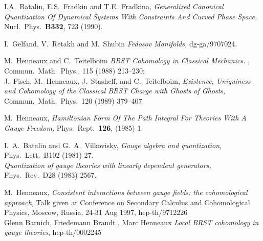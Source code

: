 \documentclass[a4paper,11pt,oneside]{amsart}
\theoremstyle{plain}
\numberwithin{equation}{section} %
\numberwithin{figure}{section} %
\def\PRD{Phys.\ Rev.\ D}
\def\PLB{Phys.\ Lett.\ B}
\begin{document}
\begin{thebibliography}{33}
\bibitem{[BFF]}
I.A.~Batalin, E.S.~Fradkin and T.E.~Fradkina,
{\em Generalized Canonical Quantization Of Dynamical Systems With
  Constraints And Curved Phase Space,}
Nucl.\ Phys.\ {\bf B332}, 723 (1990).

\bibitem{[GRS]} I.~Gelfand, V.~Retakh and M.~Shubin
{\em Fedosov Manifolds,} dg-ga/9707024.

\bibitem{[HTS]} M.~Henneaux and C.~Teitelboim
{\em BRST Cohomology in Classical Mechanics.}
, Commun.\ Math.\ Phys., 115
(1988) 213--230;\\
 J.~Fisch, M.~Henneaux, J.~Stasheff, and C.~Teitelboim,
{\em Existence, Uniquiness and Cohomology of the Classical BRST Charge with
Ghosts of Ghosts,} Commun.\ Math.\ Phys.\ 120 (1989) 379--407.

\bibitem{[H-omega]} M.~Henneaux,
{\em Hamiltonian Form Of The Path Integral For Theories With A Gauge Freedom,}
Phys.\ Rept.\  {\bf 126}, (1985) 1.

\bibitem{[BV]} I.~A.~Batalin and G.~A.~Vilkovisky,
{\em Gauge algebra and quantization,} \PLB{102} (1981) 27.\\
{\em Quantization of gauge theories with linearly dependent generators,}
\PRD{28} (1983) 2567.

 M.~Henneaux, {\em Consistent interactions between
gauge fields: the cohomological approach,} Talk given at Conference on
Secondary Calculus and Cohomological Physics, Moscow, Russia, 24-31 Aug 1997,
hep-th/9712226 \\
Glenn Barnich, Friedemann Brandt ,
Marc Henneaux
{\em Local BRST cohomology in gauge theories}, hep-th/0002245
\end{thebibliography}
\end{document}

